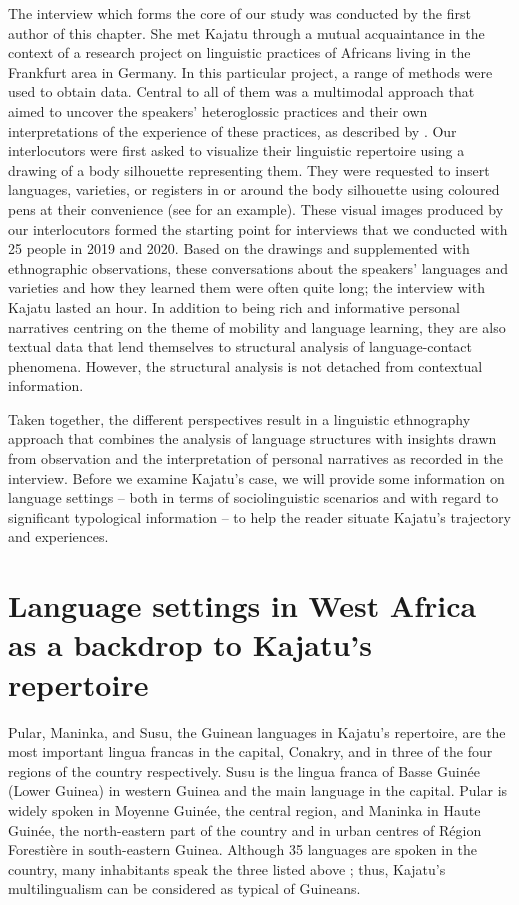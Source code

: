 \documentclass[output=paper]{langscibook}
\begin{document}
The interview which forms the core of our study was conducted by the first author of this chapter. She met Kajatu through a mutual acquaintance in the context of a research project on linguistic practices of Africans living in the Frankfurt area in Germany. In this particular project, a range of methods were used to obtain data. Central to all of them was a multimodal approach that aimed to uncover the speakers’ heteroglossic practices and their own interpretations of the experience of these practices, as described by \citet{busch_language_2018}. Our interlocutors were first asked to visualize their linguistic repertoire using a drawing of a body silhouette representing them. They were requested to insert languages, varieties, or registers in or around the body silhouette using coloured pens at their convenience (see  for an example).
These visual images produced by our interlocutors formed the starting point for interviews that we conducted with 25 people in 2019 and 2020. Based on the drawings and supplemented with ethnographic observations, these conversations about the speakers’ languages and varieties and how they learned them were often quite long; the interview with Kajatu lasted an hour. In addition to being rich and informative personal narratives centring on the theme of mobility and language learning, they are also textual data that lend themselves to structural analysis of language-contact phenomena. However, the structural analysis is not detached from contextual information. 

Taken together, the different perspectives result in a linguistic ethnography approach that combines the analysis of language structures with insights drawn from observation and the interpretation of personal narratives as recorded in the interview. Before we examine Kajatu’s case, we will provide some information on language settings – both in terms of sociolinguistic scenarios and with regard to significant typological information – to help the reader situate Kajatu’s trajectory and experiences.

\section{Language settings in West Africa as a backdrop to Kajatu’s repertoire}\label{fanego:sec:3}
\largerpage[-1]
Pular, Maninka, and Susu, the Guinean languages in Kajatu’s repertoire, are the most important lingua francas in the capital, Conakry, and in three of the four regions of the country respectively. Susu is the lingua franca of Basse Guinée (Lower Guinea) in western Guinea and the main language in the capital. Pular is widely spoken in Moyenne Guinée, the central region, and Maninka in Haute Guinée, the north-eastern part of the country and in urban centres of Région Forestière in south-eastern Guinea. Although 35 languages are spoken in the country, many inhabitants speak the three listed above \citep{barry_francais_2014}; thus, Kajatu’s multilingualism can be considered as typical of Guineans. 
\end{document}

